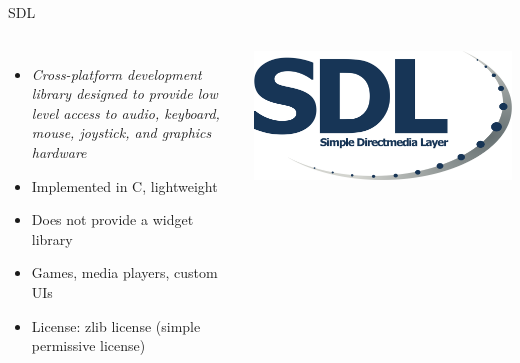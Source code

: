 \begin{frame}{SDL}
  \begin{columns}
    \begin{itemize}
    \item {\em Cross-platform development library designed to provide
        low level access to audio, keyboard, mouse, joystick, and
        graphics hardware}
    \item Implemented in C, lightweight
    \item Does not provide a widget library
    \item Games, media players, custom UIs
    \item License: zlib license (simple permissive license)
    \end{itemize}
    \includegraphics[width=\textwidth]{slides/sysdev-software-stacks/sdl-logo.png}
  \end{columns}
\end{frame}

